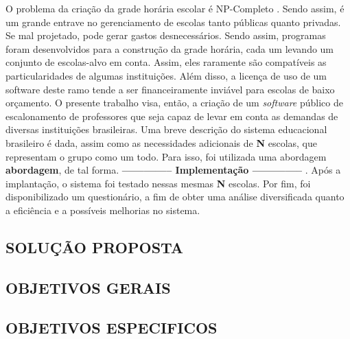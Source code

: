 \documentclass[12pt,a4paper]{article}
\begin{document}
		O problema da criação da grade horária escolar é NP-Completo \cite{complexity}. Sendo assim, é um grande entrave no gerenciamento de escolas tanto públicas quanto privadas. Se mal projetado, pode gerar gastos desnecessários. Sendo assim, programas foram desenvolvidos para a construção da grade horária, cada um levando um conjunto de escolas-alvo em conta. Assim, eles raramente são compatíveis as particularidades de algumas instituições. Além disso, a licença de uso de um software deste ramo tende a ser financeiramente inviável para escolas de baixo orçamento. O presente trabalho visa, então, a criação de um \textit{software} público de escalonamento de professores que seja capaz de levar em conta as demandas de diversas instituições brasileiras. Uma breve descrição do sistema educacional brasileiro é dada, assim como as necessidades adicionais de \textbf{N} escolas, que representam o grupo como um todo. Para isso, foi utilizada uma abordagem \textbf{abordagem}, de tal forma. \textbf{ -------------- Implementação -------------- }. Após a implantação, o sistema foi testado nessas mesmas \textbf{N} escolas. Por fim, foi disponibilizado um questionário, a fim de obter uma análise diversificada quanto a eficiência e a possíveis melhorias no sistema.



		\subsection{SOLUÇÃO PROPOSTA}

			\lipsum[1]


		\subsection{OBJETIVOS GERAIS}

			\lipsum[1]


		\subsection{OBJETIVOS ESPECIFICOS}

			\lipsum[1]

	\newpage
\end{document}
